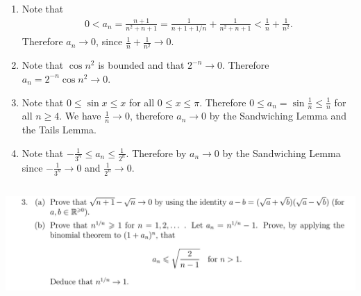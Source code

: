 \documentclass[12pt]{article}
\begin{document}
\begin{enumerate}[label=(\roman*)]
\item Note that
  \begin{align*}
    0 < a_n
    = \frac{n + 1}{n^2 + n + 1}
    = \frac{1}{n + 1 + 1/n} + \frac{1}{n^2 + n + 1}
    < \frac{1}{n} + \frac{1}{n^2}.
  \end{align*}
  Therefore $a_n \to 0$, since $\frac{1}{n} + \frac{1}{n^2} \to 0$.
\item Note that $\cos n^2$ is bounded and that $2^{-n} \to 0$. Therefore
  $a_n = 2^{-n}\cos n^2 \to 0$.
\item Note that $0 \leq \sin x \leq x$ for all $0 \leq x \leq \pi$. Therefore
  $0 \leq a_n = \sin \frac{1}{n} \leq \frac{1}{n}$ for all $n \geq 4$. We have $\frac{1}{n} \to 0$,
  therefore $a_n \to 0$ by the Sandwiching Lemma and the Tails Lemma.
\item Note that $-\frac{1}{3^n} \leq a_n \leq \frac{1}{2^n}$. Therefore by $a_n \to 0$ by the
  Sandwiching Lemma since $-\frac{1}{3^n} \to 0$ and $\frac{1}{2^n} \to 0$.
\end{enumerate}

\newpage
\subsection{}
\begin{mdframed}
\includegraphics[width=400pt]{img/oxford-M2-analysis-I-3-3.png}
\end{mdframed}
\end{document}
